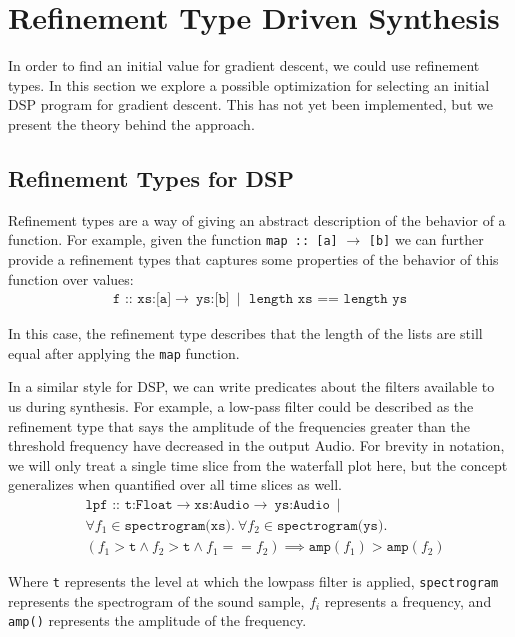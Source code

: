\section{Refinement Type Driven Synthesis}
\label{sec:rtypes}

In order to find an initial value for gradient descent, we could use refinement types.
In this section we explore a possible optimization for selecting an initial DSP program for gradient descent.
This has not yet been implemented, but we present the theory behind the approach.

\subsection{Refinement Types for DSP}
\label{sec:retypeSearch}
Refinement types are a way of giving an abstract description of the behavior of a function. 
For example, given the function 
%
\texttt{map :: [a]} $\to$ \texttt{[b]}
%
we can further provide a refinement types that captures some properties of the behavior of this function over values:
%
\begin{align*}
\texttt{f :: xs:[a]} \to\ \texttt{ys:[b]}\ \mid \texttt{ length xs == length ys}
\end{align*}

\noindent In this case, the refinement type describes that the length of the lists are still equal after applying the \texttt{map} function.

In a similar style for DSP, we can write predicates about the filters available to us during synthesis. 
For example, a low-pass filter could be described as the refinement type that says the amplitude of the frequencies greater than the threshold frequency have decreased in the output Audio.
For brevity in notation, we will only treat a single time slice from the waterfall plot here, but the concept generalizes when quantified over all time slices as well.
%
\begin{align*}
  &\texttt{lpf :: t:Float} \to  \texttt{xs:Audio} \to\ \texttt{ys:Audio}\ \mid \\
  &\forall f_1 \in  \texttt{spectrogram(xs)}.\ \forall f_2 \in \texttt{spectrogram(ys)}. \\
  &(f_1 > \texttt{t}  \land  f_2 > \texttt{t}  \land f_1 == f_2) \implies \texttt{amp}(f_1) > \texttt{amp}(f_2)
\end{align*}

Where \texttt{t} represents the level at which the lowpass filter is applied, \texttt{spectrogram} represents the spectrogram of the sound sample, $f_i$ represents a frequency, and \texttt{amp()} represents the amplitude of the frequency. 

